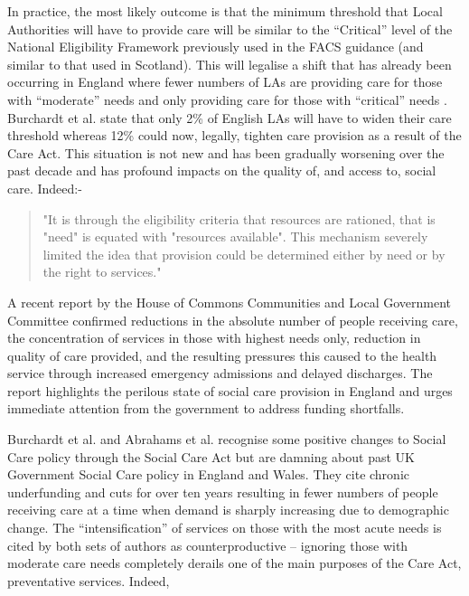 \documentclass[12pt,]{report}
\begin{document}
In practice, the most likely outcome is that the minimum threshold that
Local Authorities will have to provide care will be similar to the
``Critical'' level of the National Eligibility Framework previously used
in the FACS guidance \citep{RN173, RN177} (and similar to that used in
Scotland). This will legalise a shift that has already been occurring in
England where fewer numbers of LAs are providing care for those with
``moderate'' needs and only providing care for those with ``critical''
needs \citep{RN173, RN177}. Burchardt et al. \citeyearpar{RN173} state
that only 2\% of English LAs will have to widen their care threshold
whereas 12\% could now, legally, tighten care provision as a result of
the Care Act. This situation is not new and has been gradually worsening
over the past decade and has profound impacts on the quality of, and
access to, social care. Indeed:-

\begin{quotation}
"It is through the eligibility criteria that resources are rationed, that is "need" is equated with "resources available". This mechanism severely limited the idea that provision could be determined either by need or by the right to services."
\end{quotation}

\citep[pp.10]{RN374}

A recent report by the House of Commons Communities and Local Government
Committee \citeyearpar{RN287} confirmed reductions in the absolute
number of people receiving care, the concentration of services in those
with highest needs only, reduction in quality of care provided, and the
resulting pressures this caused to the health service through increased
emergency admissions and delayed discharges. The report highlights the
perilous state of social care provision in England and urges immediate
attention from the government to address funding shortfalls.

Burchardt et al. \citeyearpar{RN173} and Abrahams et al.
\citeyearpar{RN177} recognise some positive changes to Social Care
policy through the Social Care Act but are damning about past UK
Government Social Care policy in England and Wales. They cite chronic
underfunding and cuts for over ten years resulting in fewer numbers of
people receiving care at a time when demand is sharply increasing due to
demographic change. The ``intensification'' of services on those with
the most acute needs is cited by both sets of authors as
counterproductive -- ignoring those with moderate care needs completely
derails one of the main purposes of the Care Act, preventative services.
Indeed,
\end{document}
